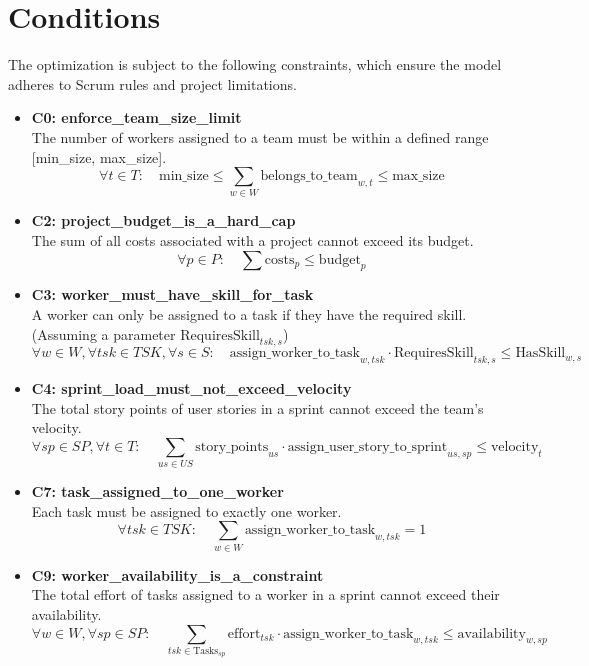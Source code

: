 \documentclass{article}
\begin{document}
\section{Conditions}
The optimization is subject to the following constraints, which ensure the model adheres to Scrum rules and project limitations.
\begin{itemize}
    \item \textbf{C0: enforce\_team\_size\_limit} \\ The number of workers assigned to a team must be within a defined range [min\_size, max\_size].
        $$ \forall t \in T: \quad \text{min\_size} \leq \sum_{w \in W} \text{belongs\_to\_team}_{w,t} \leq \text{max\_size} $$
    \item \textbf{C2: project\_budget\_is\_a\_hard\_cap} \\ The sum of all costs associated with a project cannot exceed its budget.
        $$ \forall p \in P: \quad \sum \text{costs}_p \leq \text{budget}_p $$
    \item \textbf{C3: worker\_must\_have\_skill\_for\_task} \\ A worker can only be assigned to a task if they have the required skill. (Assuming a parameter $\text{RequiresSkill}_{tsk,s}$)
        $$ \forall w \in W, \forall tsk \in TSK, \forall s \in S: \quad \text{assign\_worker\_to\_task}_{w, tsk} \cdot \text{RequiresSkill}_{tsk, s} \leq \text{HasSkill}_{w,s} $$
    \item \textbf{C4: sprint\_load\_must\_not\_exceed\_velocity} \\ The total story points of user stories in a sprint cannot exceed the team's velocity.
        $$ \forall sp \in SP, \forall t \in T: \quad \sum_{us \in US} \text{story\_points}_{us} \cdot \text{assign\_user\_story\_to\_sprint}_{us, sp} \leq \text{velocity}_{t} $$
    \item \textbf{C7: task\_assigned\_to\_one\_worker} \\ Each task must be assigned to exactly one worker.
        $$ \forall tsk \in TSK: \quad \sum_{w \in W} \text{assign\_worker\_to\_task}_{w, tsk} = 1 $$
    \item \textbf{C9: worker\_availability\_is\_a\_constraint} \\ The total effort of tasks assigned to a worker in a sprint cannot exceed their availability.
        $$ \forall w \in W, \forall sp \in SP: \quad \sum_{tsk \in \text{Tasks}_{sp}} \text{effort}_{tsk} \cdot \text{assign\_worker\_to\_task}_{w, tsk} \leq \text{availability}_{w, sp} $$
\end{itemize}
\end{document}
